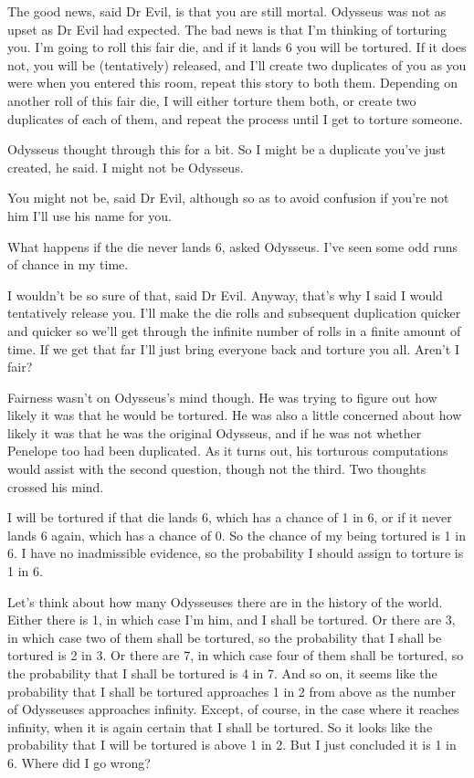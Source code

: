 \documentclass[
  11pt,
  letterpaper,
  DIV=11,
  numbers=noendperiod,
  oneside]{scrartcl}
\begin{document}
The good news, said Dr Evil, is that you are still mortal. Odysseus was
not as upset as Dr Evil had expected. The bad news is that I'm thinking
of torturing you. I'm going to roll this fair die, and if it lands 6 you
will be tortured. If it does not, you will be (tentatively) released,
and I'll create two duplicates of you as you were when you entered this
room, repeat this story to both them. Depending on another roll of this
fair die, I will either torture them both, or create two duplicates of
each of them, and repeat the process until I get to torture
someone.

Odysseus thought through this for a bit. So I might be a duplicate
you've just created, he said. I might not be Odysseus.

You might not be, said Dr Evil, although so as to avoid confusion if
you're not him I'll use his name for you.

What happens if the die never lands 6, asked Odysseus. I've seen some
odd runs of chance in my time.

I wouldn't be so sure of that, said Dr Evil. Anyway, that's why I said I
would tentatively release you. I'll make the die rolls and subsequent
duplication quicker and quicker so we'll get through the infinite number
of rolls in a finite amount of time. If we get that far I'll just bring
everyone back and torture you all. Aren't I fair?

Fairness wasn't on Odysseus's mind though. He was trying to figure out
how likely it was that he would be tortured. He was also a little
concerned about how likely it was that he was the original Odysseus, and
if he was not whether Penelope too had been duplicated. As it turns out,
his torturous computations would assist with the second question, though
not the third. Two thoughts crossed his mind.

I will be tortured if that die lands 6, which has a chance of 1 in 6, or
if it never lands 6 again, which has a chance of 0. So the chance of my
being tortured is 1 in 6. I have no inadmissible evidence, so the
probability I should assign to torture is 1 in 6.

Let's think about how many Odysseuses there are in the history of the
world. Either there is 1, in which case I'm him, and I shall be
tortured. Or there are 3, in which case two of them shall be tortured,
so the probability that I shall be tortured is 2 in 3. Or there are 7,
in which case four of them shall be tortured, so the probability that I
shall be tortured is 4 in 7. And so on, it seems like the probability
that I shall be tortured approaches 1 in 2 from above as the number of
Odysseuses approaches infinity. Except, of course, in the case where it
reaches infinity, when it is again certain that I shall be tortured. So
it looks like the probability that I will be tortured is above 1 in 2.
But I just concluded it is 1 in 6. Where did I go wrong?
\end{document}

